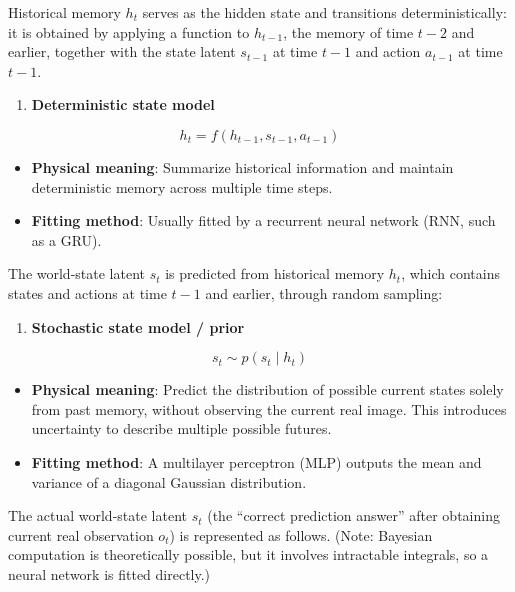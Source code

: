 Historical memory \(h_t\) serves as the hidden state and transitions deterministically: it is obtained by applying a function to \(h_{t-1}\), the memory of time \(t-2\) and earlier, together with the state latent \(s_{t-1}\) at time \(t-1\) and action \(a_{t-1}\) at time \(t-1\).

\begin{enumerate}
\def\labelenumi{\arabic{enumi}.}
\tightlist
\item
  \textbf{Deterministic state model}
\end{enumerate}

\[
h_t = f(h_{t-1}, s_{t-1}, a_{t-1})
\]

\begin{itemize}
\tightlist
\item
  \textbf{Physical meaning}: Summarize historical information and maintain deterministic memory across multiple time steps.
\item
  \textbf{Fitting method}: Usually fitted by a recurrent neural network (RNN, such as a GRU).
\end{itemize}

The world-state latent \(s_t\) is predicted from historical memory \(h_t\), which contains states and actions at time \(t-1\) and earlier, through random sampling:

\begin{enumerate}
\def\labelenumi{\arabic{enumi}.}
\setcounter{enumi}{1}
\tightlist
\item
  \textbf{Stochastic state model / prior}
\end{enumerate}

\[
s_t \sim p(s_t \mid h_t)
\]

\begin{itemize}
\tightlist
\item
  \textbf{Physical meaning}: Predict the distribution of possible current states solely from past memory, without observing the current real image. This introduces uncertainty to describe multiple possible futures.
\item
  \textbf{Fitting method}: A multilayer perceptron (MLP) outputs the mean and variance of a diagonal Gaussian distribution.
\end{itemize}

The actual world-state latent \(s_t\) (the ``correct prediction answer'' after obtaining current real observation \(o_t\)) is represented as follows. (Note: Bayesian computation is theoretically possible, but it involves intractable integrals, so a neural network is fitted directly.)

